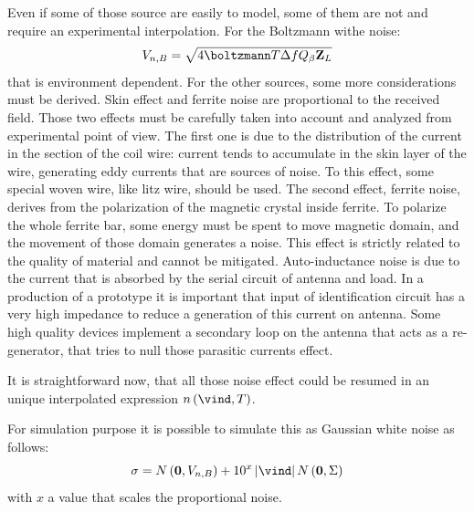 Even if some of those source are easily to model, some of them are not and require an experimental interpolation. For the Boltzmann withe noise:
\[
V_{n,B} = \sqrt{4 \boltzmann T \Delta f Q_{\beta} \mathbf{Z}_{L}}
\]
that is environment dependent. For the other sources, some more considerations must be derived. Skin effect and ferrite noise are proportional to the received field. 
Those two effects must be carefully taken into account and analyzed from experimental point of view. The first one is due to the distribution of the current in the section of the coil wire: current tends to accumulate in the skin layer of the wire, generating eddy currents that are sources of noise. To this effect, some special woven wire, like litz wire, should be used.
The second effect, ferrite noise, derives from the polarization of the magnetic crystal inside ferrite. To polarize the whole ferrite bar, some energy must be spent to move magnetic domain, and the movement of those domain generates a noise. This effect is strictly related to the quality of material and cannot be mitigated.
Auto-inductance noise is due to the current that is absorbed by the serial circuit of antenna and load. In a production of a prototype it is important that input of identification circuit has a very high impedance to reduce a generation of this current on antenna. Some high quality devices implement a secondary loop on the antenna that acts as a re-generator, that tries to null those parasitic currents effect.

It is straightforward now, that all those noise effect could be resumed in an unique interpolated expression ${n \braces{\vind,T}}$.

For simulation purpose it is possible to simulate this as Gaussian white noise as follows:
\begin{equation}
\sigma = N\braces{\mathbf{0}, V_{n,B}} + 10^{x} \abs{\vind} N\braces{\mathbf{0}, \Sigma}
\end{equation}
with $x$ a value that scales the proportional noise.